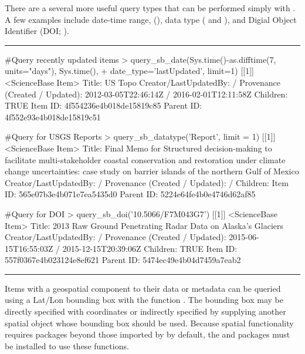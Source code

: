 There are a several more useful query types that can be performed simply with . 
A few examples include date-time range, (), data type 
( and ), and Digial Object Identifier (DOI; ). 

\noindent\rule{\textwidth}{0.4pt}
\begin{example}
#Query recently updated items
> query_sb_date(Sys.time()-as.difftime(7, units="days"), Sys.time(),
+    date_type='lastUpdated', limit=1)
[[1]]
<ScienceBase Item>
  Title: US Topo
  Creator/LastUpdatedBy:      /
  Provenance (Created / Updated):  2012-03-05T22:46:14Z / 2016-02-01T12:11:58Z
  Children: TRUE
  Item ID: 4f554236e4b018de15819c85
  Parent ID: 4f552e93e4b018de15819c51


#Query for USGS Reports
> query_sb_datatype('Report', limit = 1)
[[1]]
<ScienceBase Item> 
  Title: Final Memo for Structured decision-making to facilitate multi-stakeholder coastal conservation and restoration under climate change uncertainties: case study on barrier islands of the northern Gulf of Mexico
  Creator/LastUpdatedBy:      / 
  Provenance (Created / Updated):   / 
  Children: 
  Item ID: 565e07b3e4b071e7ea5435d0
  Parent ID: 5224e64fe4b0e4746d62af85
  
#Query for DOI
> query_sb_doi('10.5066/F7M043G7')
[[1]]
<ScienceBase Item>
  Title: 2013 Raw Ground Penetrating Radar Data on Alaska's Glaciers
  Creator/LastUpdatedBy:      /
  Provenance (Created / Updated):  2015-06-15T16:55:03Z / 2015-12-15T20:39:06Z
  Children: TRUE
  Item ID: 557f0367e4b023124e8ef621
  Parent ID: 5474ec49e4b04d7459a7eab2
\end{example}
\noindent\rule{\textwidth}{0.4pt}


Items with a geospatial component to their data or metadata can be queried using a
Lat/Lon bounding box with the function . The
bounding box may be directly specified with coordinates or indirectly specified
by supplying another spatial object whose bounding box should be used. Because
spatial functionality requires packages beyond those imported by  by default,
the  and  packages must be installed to use these functions.

